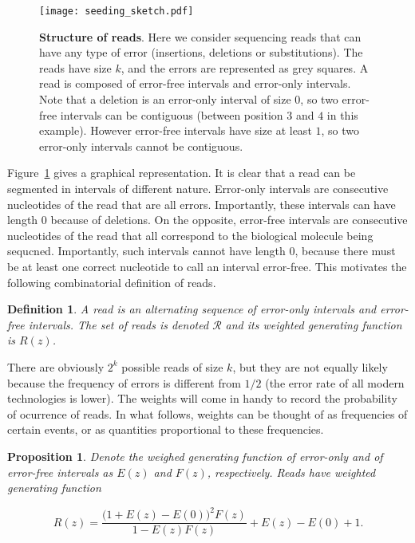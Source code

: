 \documentclass{article}
\newtheorem{definition}{Definition}
\newtheorem{proposition}{Proposition}
\begin{document}
\begin{figure}[h]
\centering
\texttt{[image: seeding\_sketch.pdf]}
\caption{\textbf{Structure of reads}. Here we consider sequencing reads
that can have any type of error (insertions, deletions or substitutions).
The reads have size $k$, and the errors are represented as grey squares. A
read is composed of error-free intervals and error-only intervals. Note
that a deletion is an error-only interval of size $0$, so two error-free
intervals can be contiguous (between position $3$ and $4$ in this
example). However error-free intervals have size at least $1$, so two
error-only intervals cannot be contiguous.}
\label{fig:sketchseed}
\end{figure}

Figure~\ref{fig:sketchseed} gives a graphical representation.  It is clear
that a read can be segmented in intervals of different nature.  Error-only
intervals are consecutive nucleotides of the read that are all errors.
Importantly, these intervals can have length $0$ because of deletions. On
the opposite, error-free intervals are consecutive nucleotides of the read
that all correspond to the biological molecule being sequcned.
Importantly, such intervals cannot have length $0$, because there must be
at least one correct nucleotide to call an interval error-free. This
motivates the following combinatorial definition of reads.

\begin{definition}
\label{def:read}
A read is an alternating sequence of error-only intervals and error-free
intervals. The set of reads is denoted $\mathcal{R}$ and its weighted
generating function is $R(z)$.
\end{definition}

There are obviously $2^k$ possible reads of size $k$, but they are not
equally likely because the frequency of errors is different from $1/2$
(the error rate of all modern technologies is lower). The weights will
come in handy to record the probability of ocurrence of reads. In what
follows, weights can be thought of as frequencies of certain events, or as
quantities proportional to these frequencies.

\begin{proposition}
\label{th:R}
Denote the weighed generating function of error-only and of error-free
intervals as $E(z)$ and $F(z)$, respectively. Reads have weighted
generating function

\begin{equation}
\label{eq:R}
R(z) = \frac{\big(1+E(z)-E(0)\big)^2F(z)}{1-E(z)F(z)} + E(z)-E(0)+1.
\end{equation}
\end{proposition}
\end{document}
